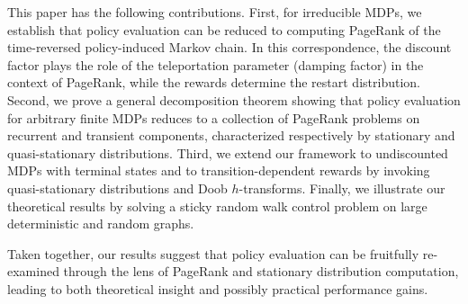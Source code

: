 \documentclass[letterpaper, 10 pt, conference]{ieeeconf}
\begin{document}
This paper has the following contributions. First, for irreducible MDPs, we establish that policy evaluation can be reduced to computing PageRank of the time-reversed policy-induced Markov chain. 
In this correspondence, the discount factor plays the role of the teleportation parameter (damping factor) in the context of PageRank, while the rewards determine the restart distribution.    
Second, we prove a general decomposition theorem showing that policy evaluation
for arbitrary finite MDPs reduces to a collection of PageRank problems on
recurrent and transient components, characterized respectively by stationary
and quasi-stationary distributions. 
Third, we extend our framework to undiscounted MDPs with terminal states and to transition-dependent rewards by invoking quasi-stationary distributions and Doob $h$-transforms. 
Finally, we illustrate our theoretical results by solving a sticky random walk control problem on large deterministic and random graphs.

Taken together, our results suggest that policy evaluation can be fruitfully re-examined through the lens of PageRank and stationary distribution computation, leading to both theoretical insight and possibly practical performance gains.


\end{document}
